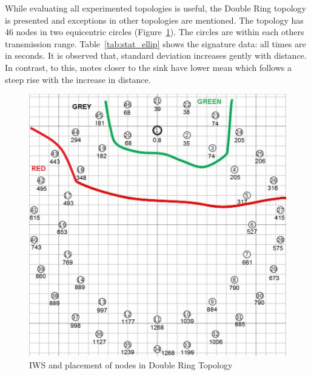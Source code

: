 \documentclass[conference]{IEEEtran}
\begin{document}
While evaluating all experimented topologies is useful, the Double Ring topology is presented and  exceptions in other topologies are mentioned.
The topology has 46 nodes in two equicentric circles (Figure~\ref{fig:elliptopo}).
The circles are within each others transmission range.
Table~\ref{tab:stat_ellip} shows the signature data: all times are in seconds.
It is observed that, standard deviation increases gently with distance.
In contrast, to this, %
motes closer to the sink have lower mean which follows a steep rise with the increase in distance.


\begin{figure}[t]
    \centering
        \includegraphics[width=.8\linewidth]{DoubleRingZ}
        \caption{IWS and placement of nodes in Double Ring Topology}
        \label{fig:elliptopo} 
    \end{figure}
\end{document}
